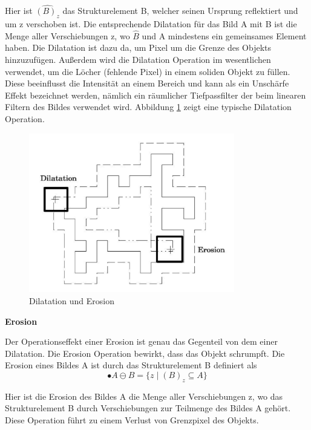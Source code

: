Hier ist $ \widehat{(B)_z} $ das Strukturelement B, welcher seinen Ursprung reflektiert und um z verschoben ist. Die entsprechende Dilatation für das Bild A mit B ist die Menge aller Verschiebungen z, wo $ \widehat{B} $ und A mindestens ein gemeinsames Element haben. Die Dilatation ist dazu da, um Pixel um die Grenze des Objekts hinzuzufügen. Außerdem wird die Dilatation Operation im wesentlichen verwendet, um die Löcher (fehlende Pixel) in einem soliden Objekt zu füllen. Diese beeinflusst die Intensität an einem Bereich und kann als ein Unschärfe Effekt bezeichnet werden, nämlich ein räumlicher Tiefpassfilter der beim linearen Filtern des Bildes verwendet wird. Abbildung \ref{fig:Dilatation und Erosion} zeigt eine typische Dilatation Operation.

\begin{figure}[H]
 \centering 
  \includegraphics[keepaspectratio,width=0.8\textwidth]{images/4_ZweiteErfahrung/Morphological/DilatationundErosion.pdf}
 \caption{Dilatation und Erosion}
 \label{fig:Dilatation und Erosion}
\end{figure} 


\textbf{Erosion}

Der Operationseffekt einer Erosion ist genau das Gegenteil von dem einer Dilatation. Die Erosion Operation bewirkt, dass das Objekt schrumpft. Die Erosion eines Bildes A ist durch das Strukturelement B definiert als 
\begin{equation}
•A \ominus B =\lbrace z \mid (B)_z \subseteq A \rbrace  
\end{equation}

Hier ist die Erosion des Bildes A die Menge aller Verschiebungen z, wo das Strukturelement B durch Verschiebungen zur Teilmenge des Bildes A gehört. Diese Operation führt zu einem Verlust von Grenzpixel des Objekts.

